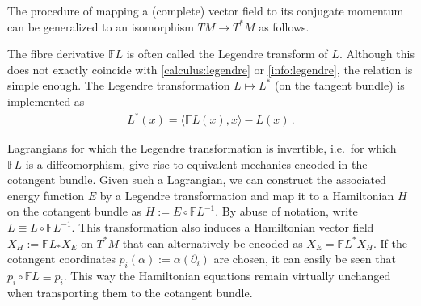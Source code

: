    The procedure of mapping a (complete) vector field to its conjugate momentum can be generalized to an isomorphism $TM\rightarrow T^*M$ as follows.
    \begin{remark}
        The fibre derivative $\mathbb{F}L$ is often called the Legendre transform of $L$. Although this does not exactly coincide with \cref{calculus:legendre} or \cref{info:legendre}, the relation is simple enough. The Legendre transformation $L\mapsto L^*$ (on the tangent bundle) is implemented as
        \begin{gather}
            L^*(x) = \langle\mathbb{F}L(x),x\rangle - L(x)\,.
        \end{gather}
    \end{remark}

    Lagrangians for which the Legendre transformation is invertible, i.e.~for which $\mathbb{F}L$ is a diffeomorphism, give rise to equivalent mechanics encoded in the cotangent bundle. Given such a Lagrangian, we can construct the associated energy function $E$ by a Legendre transformation and map it to a Hamiltonian $H$ on the cotangent bundle as $H:=E\circ\mathbb{F}L^{-1}$. By abuse of notation, write $L\equiv L\circ\mathbb{F}L^{-1}$. This transformation also induces a Hamiltonian vector field $X_H:=\mathbb{F}L_*X_E$ on $T^*M$ that can alternatively be encoded as $X_E=\mathbb{F}L^*X_H$. If the cotangent coordinates $p_i(\alpha) := \alpha(\partial_i)$ are chosen, it can easily be seen that $p_i\circ\mathbb{F}L\equiv p_i$. This way the Hamiltonian equations remain virtually unchanged when transporting them to the cotangent bundle.

